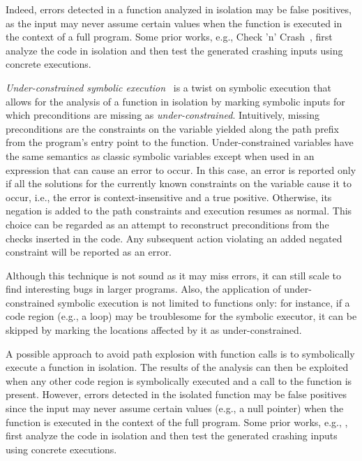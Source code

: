 Indeed, errors detected in a function analyzed in isolation may be false positives, as the input may never assume certain values when the function is executed in the context of a full program. Some prior works, e.g., {\sc Check 'n' Crash}~\cite{CS-ICSE05}, first analyze the code in isolation and then test the generated crashing inputs using concrete executions.

{\em Under-constrained symbolic execution}~\cite{ED-ISSTA07} is a twist on symbolic execution that allows for the analysis of a function in isolation by marking symbolic inputs for which preconditions are missing as {\em under-constrained}. Intuitively, missing preconditions are the constraints on the variable yielded along the path prefix from the program's entry point to the function. Under-constrained variables have the same semantics as classic symbolic variables except when used in an expression that can cause an error to occur. In this case, an error is reported only if all the solutions for the currently known constraints on the variable cause it to occur, i.e., the error is context-insensitive and a true positive. Otherwise, its negation is added to the path constraints and execution resumes as normal. This choice can be regarded as an attempt to reconstruct preconditions from the checks inserted in the code. Any subsequent action violating an added negated constraint will be reported as an error.

Although this technique is not sound as it may miss errors, it can still scale to find interesting bugs in larger programs. Also, the application of under-constrained symbolic execution is not limited to functions only: for instance, if a code region (e.g., a loop) may be troublesome for the symbolic executor, it can be skipped by marking the locations affected by it as under-constrained.


\iffalse %
A possible approach to avoid path explosion with function calls is to symbolically execute a function in isolation. The results of the analysis can then be exploited when any other code region is symbolically executed and a call to the function is present. However, errors detected in the isolated function may be false positives since the input may never assume certain values (e.g., a null pointer) when the function is executed in the context of the full program. Some prior works, e.g., \cite{CS-ICSE05}, first analyze the code in isolation and then test the generated crashing inputs using concrete executions. %

